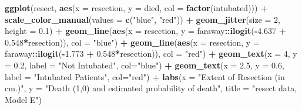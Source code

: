\documentclass[]{book}
\newenvironment{Shaded}{\begin{snugshade}}{\end{snugshade}}
\newcommand{\KeywordTok}[1]{\textcolor[rgb]{0.13,0.29,0.53}{\textbf{#1}}}
\newcommand{\DataTypeTok}[1]{\textcolor[rgb]{0.13,0.29,0.53}{#1}}
\newcommand{\DecValTok}[1]{\textcolor[rgb]{0.00,0.00,0.81}{#1}}
\newcommand{\FloatTok}[1]{\textcolor[rgb]{0.00,0.00,0.81}{#1}}
\newcommand{\StringTok}[1]{\textcolor[rgb]{0.31,0.60,0.02}{#1}}
\newcommand{\OperatorTok}[1]{\textcolor[rgb]{0.81,0.36,0.00}{\textbf{#1}}}
\newcommand{\NormalTok}[1]{#1}
\theoremstyle{definition}
\theoremstyle{definition}
\theoremstyle{definition}
\theoremstyle{remark}
\begin{document}
\begin{Shaded}
\begin{Highlighting}[]
\KeywordTok{ggplot}\NormalTok{(resect, }\KeywordTok{aes}\NormalTok{(}\DataTypeTok{x =}\NormalTok{ resection, }\DataTypeTok{y =}\NormalTok{ died, }
                   \DataTypeTok{col =} \KeywordTok{factor}\NormalTok{(intubated))) }\OperatorTok{+}\StringTok{ }
\StringTok{    }\KeywordTok{scale_color_manual}\NormalTok{(}\DataTypeTok{values =} \KeywordTok{c}\NormalTok{(}\StringTok{"blue"}\NormalTok{, }\StringTok{"red"}\NormalTok{)) }\OperatorTok{+}
\StringTok{    }\KeywordTok{geom_jitter}\NormalTok{(}\DataTypeTok{size =} \DecValTok{2}\NormalTok{, }\DataTypeTok{height =} \FloatTok{0.1}\NormalTok{) }\OperatorTok{+}
\StringTok{    }\KeywordTok{geom_line}\NormalTok{(}\KeywordTok{aes}\NormalTok{(}\DataTypeTok{x =}\NormalTok{ resection, }
                  \DataTypeTok{y =}\NormalTok{ faraway}\OperatorTok{::}\KeywordTok{ilogit}\NormalTok{(}\OperatorTok{-}\FloatTok{4.637} \OperatorTok{+}\StringTok{ }\FloatTok{0.548}\OperatorTok{*}\NormalTok{resection)),}
              \DataTypeTok{col =} \StringTok{"blue"}\NormalTok{) }\OperatorTok{+}
\StringTok{    }\KeywordTok{geom_line}\NormalTok{(}\KeywordTok{aes}\NormalTok{(}\DataTypeTok{x =}\NormalTok{ resection,}
                  \DataTypeTok{y =}\NormalTok{ faraway}\OperatorTok{::}\KeywordTok{ilogit}\NormalTok{(}\OperatorTok{-}\FloatTok{1.773} \OperatorTok{+}\StringTok{ }\FloatTok{0.548}\OperatorTok{*}\NormalTok{resection)),}
              \DataTypeTok{col =} \StringTok{"red"}\NormalTok{) }\OperatorTok{+}
\StringTok{    }\KeywordTok{geom_text}\NormalTok{(}\DataTypeTok{x =} \DecValTok{4}\NormalTok{, }\DataTypeTok{y =} \FloatTok{0.2}\NormalTok{, }\DataTypeTok{label =} \StringTok{"Not Intubated"}\NormalTok{, }
              \DataTypeTok{col=}\StringTok{"blue"}\NormalTok{) }\OperatorTok{+}
\StringTok{    }\KeywordTok{geom_text}\NormalTok{(}\DataTypeTok{x =} \FloatTok{2.5}\NormalTok{, }\DataTypeTok{y =} \FloatTok{0.6}\NormalTok{, }\DataTypeTok{label =} \StringTok{"Intubated Patients"}\NormalTok{, }
              \DataTypeTok{col=}\StringTok{"red"}\NormalTok{) }\OperatorTok{+}
\StringTok{    }\KeywordTok{labs}\NormalTok{(}\DataTypeTok{x =} \StringTok{"Extent of Resection (in cm.)"}\NormalTok{,}
         \DataTypeTok{y =} \StringTok{"Death (1,0) and estimated probability of death"}\NormalTok{,}
         \DataTypeTok{title =} \StringTok{"resect data, Model E"}\NormalTok{)}
\end{Highlighting}
\end{Shaded}
\end{document}
